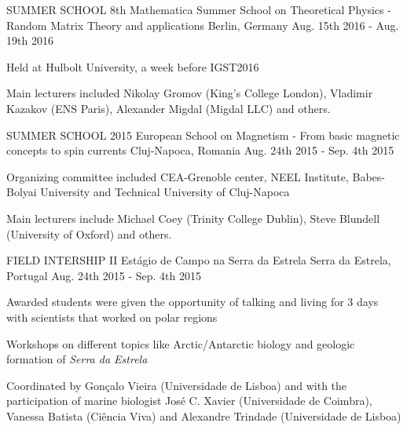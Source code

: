 

\begin{cventries}

	\cventry
	{SUMMER SCHOOL}
	{8th Mathematica Summer School on Theoretical Physics - Random Matrix Theory and applications}
	{Berlin, Germany} %
	{Aug. 15th 2016 - Aug. 19th 2016} %
	{
		\begin{cvitems} %
			\item {Held at Hulbolt University, a week before IGST2016}
			\item {Main lecturers included Nikolay Gromov (King's College London), Vladimir Kazakov (ENS Paris), Alexander Migdal (Migdal LLC) and others.}
		\end{cvitems}	
	}
	
	\cventry
	{SUMMER SCHOOL}
	{2015 European School on Magnetism - From basic magnetic concepts to spin currents}
	{Cluj-Napoca, Romania} %
	{Aug. 24th 2015 - Sep. 4th 2015} %
	{
		\begin{cvitems} %
			\item {Organizing committee included CEA-Grenoble center, NEEL Institute, Babes-Bolyai University and Technical University of Cluj-Napoca}
			\item {Main lecturers include Michael Coey (Trinity College Dublin), Steve Blundell (University of Oxford) and others.}
		\end{cvitems}	
	}
	
	\cventry
	{FIELD INTERSHIP}
	{II Estágio de Campo na Serra da Estrela} %
	{Serra da Estrela, Portugal} %
	{Aug. 24th 2015 - Sep. 4th 2015} %
	{
		\begin{cvitems} %
			\item {Awarded students were given the opportunity of talking and living for 3 days with scientists that worked on polar regions}
			\item {Workshops on different topics like Arctic/Antarctic biology and geologic formation of \emph{Serra da Estrela}}
			\item {Coordinated by Gonçalo Vieira (Universidade de Lisboa) and with the participation of marine biologist José C. Xavier (Universidade de Coimbra), Vanessa Batista (Ciência Viva) and Alexandre Trindade (Universidade de Lisboa)}
		\end{cvitems}	
	}
		
	
\end{cventries}